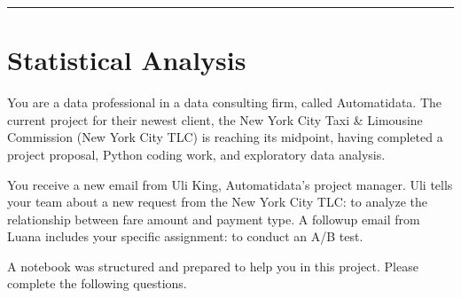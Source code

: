 \documentclass[letterpaper,10pt,english]{sphinxmanual}
\begin{document}
\bigskip\hrule\bigskip


\sphinxAtStartPar
{}

\sphinxAtStartPar
{}

\sphinxstepscope


\chapter{Statistical Analysis}
\label{\detokenize{Automatidata_Statistical Analysis:statistical-analysis}}\label{\detokenize{Automatidata_Statistical Analysis::doc}}
\sphinxAtStartPar
You are a data professional in a data consulting firm, called Automatidata. The current project for their newest client, the New York City Taxi \& Limousine Commission (New York City TLC) is reaching its midpoint, having completed a project proposal, Python coding work, and exploratory data analysis.

\sphinxAtStartPar
You receive a new email from Uli King, Automatidata’s project manager. Uli tells your team about a new request from the New York City TLC: to analyze the relationship between fare amount and payment type. A follow\sphinxhyphen{}up email from Luana includes your specific assignment: to conduct an A/B test.

\sphinxAtStartPar
A notebook was structured and prepared to help you in this project. Please complete the following questions.
\end{document}
